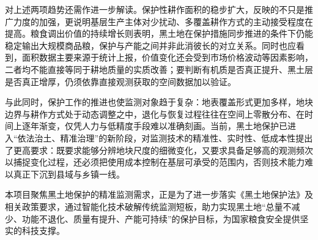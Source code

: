 对上述两项趋势还需作进一步解读。保护性耕作面积的稳步扩大，反映的不只是推广力度的加强，更说明基层生产主体对少扰动、多覆盖耕作方式的主动接受程度在提高。粮食调出价值的持续增长则表明，黑土地在保护措施同步推进的条件下仍能稳定输出大规模商品粮，保护与产能之间并非此消彼长的对立关系。同时也应看到，面积数据主要来源于统计上报，价值变化还会受到市场价格波动等因素影响，二者均不能直接等同于耕地质量的实质改善；要判断有机质是否真正提升、黑土层是否真正增厚，仍须依靠直接观测获取的空间数据加以验证。

与此同时，保护工作的推进也使监测对象趋于复杂：地表覆盖形式更加多样，地块边界与耕作方式处于动态调整之中，退化与恢复过程往往在空间上零散分布、在时间上逐年渐变，仅凭人力与低精度手段难以准确刻画。当前，黑土地保护已进入“依法治土、精准治理”的新阶段，对监测技术的精准性、实时性、低成本性提出了更高要求：既要求能够分辨地块尺度的细微变化，又要求具备足够高的观测频次以捕捉变化过程，还必须把使用成本控制在基层可承受的范围内，否则技术能力难以真正下沉到县域与乡镇一线。

本项目聚焦黑土地保护的精准监测需求，正是为了进一步落实《黑土地保护法》及相关政策要求，通过智能化技术破解传统监测短板，助力实现黑土地“总量不减少、功能不退化、质量有提升、产能可持续”的保护目标，为国家粮食安全提供坚实的科技支撑。
